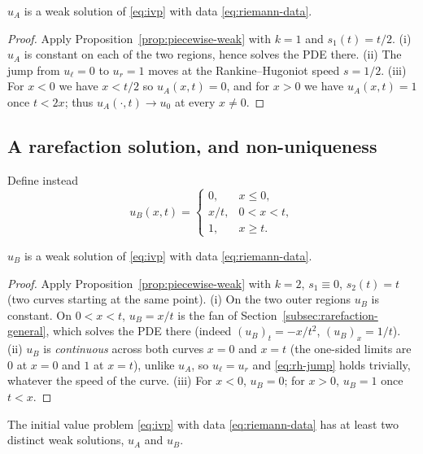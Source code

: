 \begin{proposition}
\label{prop:shock-is-weak-solution}
$u_A$ is a weak solution of \eqref{eq:ivp} with data \eqref{eq:riemann-data}.
\end{proposition}

\begin{proof}
Apply Proposition~\ref{prop:piecewise-weak} with $k=1$ and $s_1(t)=t/2$.
(i) $u_A$ is constant on each of the two regions, hence solves the PDE
there. (ii) The jump from $u_\ell=0$ to $u_r=1$ moves at the
Rankine--Hugoniot speed $s=1/2$. (iii) For $x<0$ we have $x<t/2$ so
$u_A(x,t)=0$, and for $x>0$ we have $u_A(x,t)=1$ once $t<2x$; thus
$u_A(\cdot,t)\to u_0$ at every $x\ne0$.
\end{proof}

\subsection{A rarefaction solution, and non-uniqueness}
\label{subsec:nonuniq-rarefaction}

Define instead
\begin{equation}
  \label{eq:rarefaction-solution}
  u_B(x,t) = \begin{cases}
    0, & x \le 0, \\
    x/t, & 0 < x < t, \\
    1, & x \ge t.
  \end{cases}
\end{equation}

\begin{proposition}
\label{prop:rarefaction-is-weak-solution}
$u_B$ is a weak solution of \eqref{eq:ivp} with data \eqref{eq:riemann-data}.
\end{proposition}

\begin{proof}
Apply Proposition~\ref{prop:piecewise-weak} with $k=2$, $s_1\equiv0$,
$s_2(t)=t$ (two curves starting at the same point). (i) On the two outer
regions $u_B$ is constant. On $0<x<t$, $u_B=x/t$ is the fan of Section~\ref{subsec:rarefaction-general},
which solves the PDE there (indeed $(u_B)_t=-x/t^2$, $(u_B)_x=1/t$).
(ii) $u_B$ is \emph{continuous} across both curves $x=0$ and $x=t$ (the
one-sided limits are $0$ at $x=0$ and $1$ at $x=t$), unlike $u_A$, so
$u_\ell=u_r$ and \eqref{eq:rh-jump} holds trivially, whatever the speed
of the curve. (iii) For $x<0$, $u_B=0$; for $x>0$, $u_B=1$ once $t<x$.
\end{proof}

\begin{corollary}
\label{cor:nonuniqueness}
The initial value problem \eqref{eq:ivp} with data \eqref{eq:riemann-data}
has at least two distinct weak solutions, $u_A$ and $u_B$.
\end{corollary}

